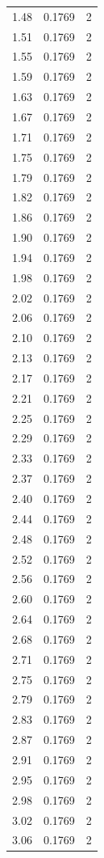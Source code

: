 \begin{longtable}{lrr}
  1.48 & 0.1769 & 2 \\
  1.51 & 0.1769 & 2 \\
  1.55 & 0.1769 & 2 \\
  1.59 & 0.1769 & 2 \\
  1.63 & 0.1769 & 2 \\
  1.67 & 0.1769 & 2 \\
  1.71 & 0.1769 & 2 \\
  1.75 & 0.1769 & 2 \\
  1.79 & 0.1769 & 2 \\
  1.82 & 0.1769 & 2 \\
  1.86 & 0.1769 & 2 \\
  1.90 & 0.1769 & 2 \\
  1.94 & 0.1769 & 2 \\
  1.98 & 0.1769 & 2 \\
  2.02 & 0.1769 & 2 \\
  2.06 & 0.1769 & 2 \\
  2.10 & 0.1769 & 2 \\
  2.13 & 0.1769 & 2 \\
  2.17 & 0.1769 & 2 \\
  2.21 & 0.1769 & 2 \\
  2.25 & 0.1769 & 2 \\
  2.29 & 0.1769 & 2 \\
  2.33 & 0.1769 & 2 \\
  2.37 & 0.1769 & 2 \\
  2.40 & 0.1769 & 2 \\
  2.44 & 0.1769 & 2 \\
  2.48 & 0.1769 & 2 \\
  2.52 & 0.1769 & 2 \\
  2.56 & 0.1769 & 2 \\
  2.60 & 0.1769 & 2 \\
  2.64 & 0.1769 & 2 \\
  2.68 & 0.1769 & 2 \\
  2.71 & 0.1769 & 2 \\
  2.75 & 0.1769 & 2 \\
  2.79 & 0.1769 & 2 \\
  2.83 & 0.1769 & 2 \\
  2.87 & 0.1769 & 2 \\
  2.91 & 0.1769 & 2 \\
  2.95 & 0.1769 & 2 \\
  2.98 & 0.1769 & 2 \\
  3.02 & 0.1769 & 2 \\
  3.06 & 0.1769 & 2 \\

\end{longtable}

